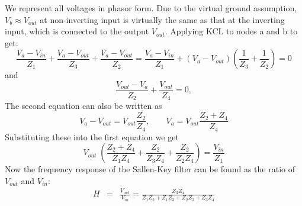 \documentclass{article}
\begin{document}

We represent all voltages in phasor form. Due to the virtual ground 
assumption, $V_b\approx V_{out}$ at non-inverting input is virtually 
the same as that at the inverting input, which is connected to the 
output $V_{out}$. Applying KCL to nodes a and b to get:
\begin{equation} 
\frac{V_a-V_{in}}{Z_1}+\frac{V_a-V_{out}}{Z_3}+\frac{V_a-V_{out}}{Z_2}
=\frac{V_a-V_{in}}{Z_1}+(V_a-V_{out})\left(\frac{1}{Z_3}+\frac{1}{Z_2}\right)=0 
\end{equation}
and
\begin{equation}
\frac{V_{out}-V_a}{Z_2}+\frac{V_{out}}{Z_4}=0,
\end{equation}
The second equation can also be written as
\begin{equation}
V_a-V_{out}=V_{out}\frac{Z_2}{Z_4}, \;\;\;\;\;\;\;V_a=V_{out}\frac{Z_2+Z_4}{Z_4}
\end{equation}
Substituting these into the first equation we get 
\begin{equation}
V_{out}\;\left(\frac{Z_2+Z_4}{Z_1Z_4}+\frac{Z_2}{Z_3Z_4}+\frac{Z_2}{Z_2Z_4} \right)
=\frac{V_{in}}{Z_1}
\end{equation}
Now the frequency response of the Sallen-Key filter can be found as
the ratio of $V_{out}$ and $V_{in}$:
\begin{eqnarray}  
  H&=&\frac{V_{out}}{V_{in}}=\frac{Z_3Z_4}{Z_1Z_2+Z_1Z_3+Z_2Z_3+Z_3Z_4} 
\end{eqnarray}
\end{document}
